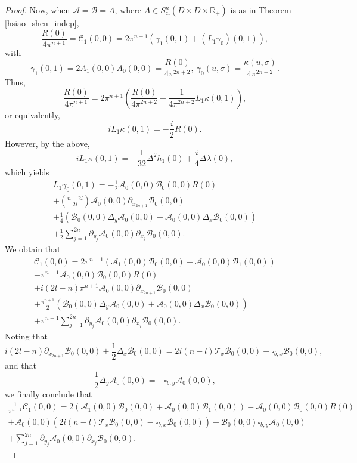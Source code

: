 \documentclass{article}
\newcommand{\RR}{\mathbb R}
\newcommand{\mca}{\mathcal A}
\newcommand{\mcb}{\mathcal B}
\newcommand{\mcc}{\mathcal C}
\newcommand{\mct}{\mathcal T}
\DeclareMathOperator{\cl}{cl}
\begin{document}
\begin{proof}
%
Now, when $\mca = \mcb = A$, where $A\in S^n_{\cl}(D \times D \times \RR_+)$ is as in Theorem \ref{hsiao_shen_indep}, $$\frac {R(0)}{4 \pi^{n+1}} = \mcc_1(0,0) = 2\pi^{n+1} \left(\gamma_1(0,1) + (L_1 \gamma_0)(0,1) \right),$$
with $$\gamma_1(0,1) = 2 A_1(0,0) A_0(0,0) = \frac{R(0)}{4\pi^{2n+2}},\ \gamma_0(u,\sigma) = \frac {\kappa(u,\sigma)} {4\pi^{2n+2}}.$$
Thus,$$\frac{R(0)}{4\pi^{n+1}} = 2\pi^{n+1} \left( \frac{R(0)}{4\pi^{2n+2}} + \frac 1 {4\pi^{2n+2}} L_1 \kappa(0,1) \right),$$
or equivalently, $$i L_1 \kappa(0,1) = -\frac i2 R(0).$$
However, by the above, 
$$iL_1 \kappa(0,1) =-\frac 1 {32} \Delta^2 h_1(0) + \frac i 4 \Delta \lambda(0),$$
which yields
\begin{multline*} L_1 \gamma_0(0,1) = -\frac 1 2 \mca_0(0,0) \mcb_0(0,0) R(0) \\ +\left(\frac{n-2l} {2i} \right)  \mca_0(0,0) \partial_{x_{2n+1}} \mcb_0(0,0) \\+ \frac 1 4 \left(\mcb_0(0,0) \Delta_y\mca_0(0,0) + \mca_0(0,0) \Delta_x \mcb_0(0,0)\right) \\+ \frac 1 2 \sum_{j=1}^{2n} \partial_{y_j} \mca_0(0,0) \partial_{x_j} \mcb_0(0,0). \end{multline*}
%
We obtain that \begin{multline*} \mcc_1(0,0) = 2\pi^{n+1} \left(\mca_1(0,0) \mcb_0(0,0) + \mca_0(0,0) \mcb_1(0,0)\right)\\ -\pi^{n+1} \mca_0(0,0) \mcb_0(0,0) R(0) \\ +i(2l-n)\pi^{n+1}  \mca_0(0,0) \partial_{x_{2n+1}} \mcb_0(0,0) \\+ \frac {\pi^{n+1}} 2 \left(\mcb_0(0,0) \Delta_y\mca_0(0,0) + \mca_0(0,0) \Delta_x \mcb_0(0,0)\right) \\+ \pi^{n+1} \sum_{j=1}^{2n} \partial_{y_j} \mca_0(0,0) \partial_{x_j} \mcb_0(0,0). \end{multline*}
%
Noting that\begin{equation*} i(2l-n) \partial_{x_{2n+1}} \mcb_0(0,0) + \frac 1 2 \Delta_x \mcb_0(0,0) = 2i(n-l) \mct_x \mcb_0(0,0) - \square_{b,x} \mcb_0(0,0),\end{equation*}
and that \begin{equation*} \frac 1 2 \Delta_y \mca_0(0,0) = -\square_{b,y} \mca_0(0,0),\end{equation*} we finally conclude that
\begin{multline*} \frac 1{\pi^{n+1}}\mcc_1(0,0) = 2 \left(\mca_1(0,0) \mcb_0(0,0) + \mca_0(0,0) \mcb_1(0,0)\right) -\mca_0(0,0) \mcb_0(0,0) R(0) \\ +\mca_0(0,0)(2i(n-l) \mct_x \mcb_0(0,0) - \square_{b,x} \mcb_0(0,0)) -\mcb_0(0,0) \square_{b,y} \mca_0(0,0)\\
+ \sum_{j=1}^{2n} \partial_{y_j} \mca_0(0,0) \partial_{x_j} \mcb_0(0,0). \end{multline*}
%
\end{proof}
%
%
\end{document}
